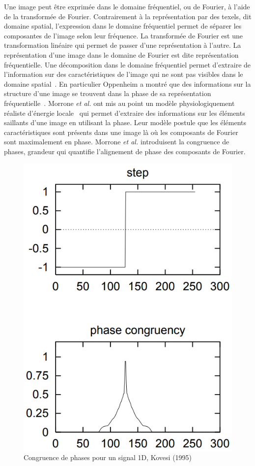 Une image peut être exprimée dans le domaine fréquentiel, ou de Fourier, à l'aide de la transformée de Fourier. Contrairement à la représentation par des texels, dit domaine spatial, l'expression dans le domaine fréquentiel permet de séparer les composantes de l'image selon leur fréquence. La transformée de Fourier est une transformation linéaire qui permet de passer d'une représentation à l'autre. La représentation d'une image dans le domaine de Fourier est dite représentation fréquentielle. Une décomposition dans le domaine fréquentiel permet d'extraire de l'information sur des caractéristiques de l'image qui ne sont pas visibles dans le domaine spatial~\cite{strumillo_fourier}. En particulier Oppenheim a montré que des informations sur la structure d'une image se trouvent dans la phase de sa représentation fréquentielle~\cite{oppenheim_importance_1981}. Morrone \textit{et al.} ont mis au point un modèle physiologiquement réaliste d'énergie locale~\cite{morrone_feature_1987, morrone_feature_1988} qui permet d'extraire des informations sur les éléments saillants d'une image en utilisant la phase. Leur modèle postule que les éléments caractéristiques sont présents dans une image là où les composants de Fourier sont maximalement en phase. Morrone \textit{et al.} introduisent la congruence de phases, grandeur qui quantifie l'alignement de phase des composants de Fourier.

\bigskip

\begin{figure}[h]
    \centering
    \includegraphics[width=.35\linewidth]{contenu/resources/images/pc_1d_kovesi}
    \caption[Congruence de phases pour un signal 1D]{Congruence de phases pour un signal 1D, Kovesi (1995)~\cite{kovesi_image_1995}}
    \label{fig:pc-1D-kovesi}
\end{figure}

